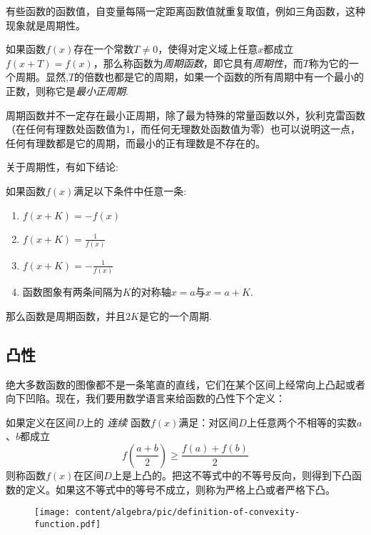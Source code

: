 有些函数的函数值，自变量每隔一定距离函数值就重复取值，例如三角函数，这种现象就是周期性。

\begin{definition}
  如果函数$f(x)$存在一个常数$T \neq 0$，使得对定义域上任意$x$都成立$f(x+T)=f(x)$，那么称函数为\emph{周期函数}，即它具有\emph{周期性}，而$T$称为它的一个周期。显然,$T$的倍数也都是它的周期，如果一个函数的所有周期中有一个最小的正数，则称它是\emph{最小正周期}.
\end{definition}

周期函数并不一定存在最小正周期，除了最为特殊的常量函数以外，狄利克雷函数（在任何有理数处函数值为1，而任何无理数处函数值为零）也可以说明这一点，任何有理数都是它的周期，而最小的正有理数是不存在的。

关于周期性，有如下结论:
\begin{theorem}
  如果函数$f(x)$满足以下条件中任意一条:
  \begin{enumerate}
  \item $f(x+K)=-f(x)$
  \item $f(x+K)=\frac{1}{f(x)}$
  \item $f(x+K)=-\frac{1}{f(x)}$
  \item 函数图象有两条间隔为$K$的对称轴$x=a$与$x=a+K$.
  \end{enumerate}
  那么函数是周期函数，并且$2K$是它的一个周期.
\end{theorem}

\subsection{凸性}
\label{sec:convex-property-of-function}

绝大多数函数的图像都不是一条笔直的直线，它们在某个区间上经常向上凸起或者向下凹陷。现在，我们要用数学语言来给函数的凸性下个定义：
\begin{definition}
 如果定义在区间$D$上的 \emph{连续} 函数$f(x)$满足：对区间$D$上任意两个不相等的实数$a$、$b$都成立
 \begin{equation}
   \label{eq:the-definition-of-convexity-function}
f(\frac{a+b}{2}) \geqslant \frac{f(a)+f(b)}{2}
 \end{equation}
则称函数$f(x)$在区间$D$上是上凸的。把这不等式中的不等号反向，则得到下凸函数的定义。如果这不等式中的等号不成立，则称为严格上凸或者严格下凸。
\end{definition}

\begin{figure}[htbp]
  \centering
\texttt{[image: content/algebra/pic/definition-of-convexity-function.pdf]}
\caption{}
\label{fig:definition-of-convexity-function}
\end{figure}

